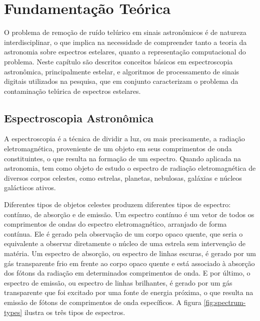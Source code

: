 
\chapter{Fundamentação Teórica}
\label{cap:fundamentacao-teorica}

O problema de remoção de ruído telúrico em sinais astronômicos é de natureza interdisciplinar, o que implica na necessidade de compreender tanto a teoria da astronomia sobre espectros estelares, quanto a representação computacional do problema.
Neste capítulo são descritos conceitos básicos em espectroscopia astronômica, principalmente estelar, e algoritmos de processamento de sinais digitais utilizados na pesquisa, que em conjunto caracterizam o problema da contaminação telúrica de espectros estelares.

\section{Espectroscopia Astronômica} \label{astronomic-spectroscopy}

A espectroscopia é a técnica de dividir a luz, ou mais precisamente, a radiação eletromagnética, proveniente de um objeto em seus comprimentos de onda constituintes, o que resulta na formação de um espectro. Quando aplicada na astronomia, tem como objeto de estudo o espectro de radiação eletromagnética de diversos corpos celestes, como estrelas, planetas, nebulosas, galáxias e núcleos galácticos ativos.

Diferentes tipos de objetos celestes produzem diferentes tipos de espectro:  contínuo, de absorção e de emissão. Um espectro contínuo é um vetor de todos os comprimentos de ondas do espectro eletromagnético, arranjado de forma contínua. Ele é gerado pela observação de um corpo opaco quente, que seria o equivalente a observar diretamente o núcleo de uma estrela sem intervenção de matéria. Um espectro de absorção, ou espectro de linhas escuras, é gerado por um gás transparente frio em frente ao corpo opaco quente e está associado à absorção dos fótons da radiação em determinados comprimentos de onda. E por último, o espectro de emissão, ou espectro de linhas brilhantes, é gerado por um gás transparente que foi excitado por uma fonte de energia próxima, o que resulta na emissão de fótons de comprimentos de onda específicos. A figura \ref{fig:spectrum-types} ilustra os três tipos de espectros. 

